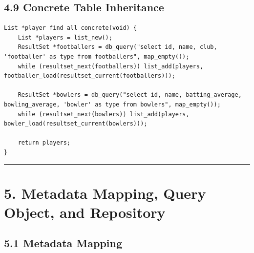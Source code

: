 \documentclass[11pt]{article}
\begin{document}
\subsection{4.9 Concrete Table
Inheritance}\label{concrete-table-inheritance}

\begin{verbatim}
List *player_find_all_concrete(void) {
    List *players = list_new();
    ResultSet *footballers = db_query("select id, name, club, 'footballer' as type from footballers", map_empty());
    while (resultset_next(footballers)) list_add(players, footballer_load(resultset_current(footballers)));

    ResultSet *bowlers = db_query("select id, name, batting_average, bowling_average, 'bowler' as type from bowlers", map_empty());
    while (resultset_next(bowlers)) list_add(players, bowler_load(resultset_current(bowlers)));

    return players;
}
\end{verbatim}

\begin{center}\rule{0.5\linewidth}{0.5pt}\end{center}

\section{5. Metadata Mapping, Query Object, and
Repository}\label{metadata-mapping-query-object-and-repository}

\subsection{5.1 Metadata Mapping}\label{metadata-mapping}
\end{document}
